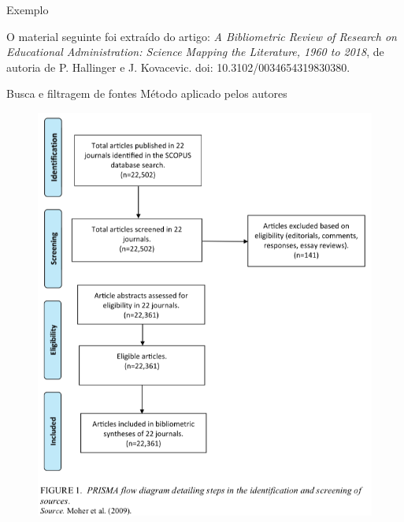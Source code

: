 \begin{frame}{Exemplo}

O material seguinte foi extraído do artigo: \textit{A Bibliometric Review of Research on Educational Administration: Science Mapping the Literature, 1960 to 2018}, de autoria de P. Hallinger e J. Kovacevic. doi: 10.3102/0034654319830380.

\end{frame}

\begin{frame}{Busca e filtragem de fontes}
Método aplicado pelos autores
\begin{figure}
\centering
\includegraphics[scale=0.25]{figs/03/exemplo-1-1}
\end{figure}
\end{frame}

